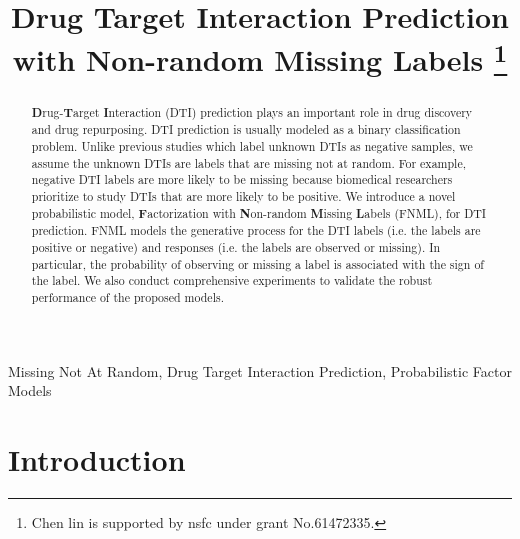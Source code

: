 \documentclass[conference]{IEEEtran}
\begin{document}
\title{Drug Target Interaction Prediction with Non-random Missing Labels
\thanks{Chen lin is supported by nsfc under grant No.61472335.}
}

\author{
\and
{}
}

\maketitle

\begin{abstract}\textbf{D}rug-\textbf{T}arget \textbf{I}nteraction (DTI) prediction plays an important role in drug discovery and drug repurposing. DTI prediction is usually modeled as a binary classification problem. Unlike previous studies which label unknown DTIs as negative samples, we assume the unknown DTIs are labels that are missing not at random. For example, negative DTI labels are more likely to be missing because biomedical researchers prioritize to study DTIs that are more likely to be positive. We introduce a novel probabilistic model, \textbf{F}actorization with \textbf{N}on-random \textbf{M}issing \textbf{L}abels (FNML), for DTI prediction.  FNML models the generative process for the DTI labels (i.e. the labels are positive or negative) and responses (i.e. the labels are observed or missing). In particular, the probability of observing or missing a label is associated with the sign of the label. We also conduct comprehensive experiments to validate the robust performance of the proposed models.
\end{abstract}

\begin{IEEEkeywords}
Missing Not At Random, Drug Target Interaction Prediction, Probabilistic Factor Models
\end{IEEEkeywords}

\section{Introduction}
\end{document}
